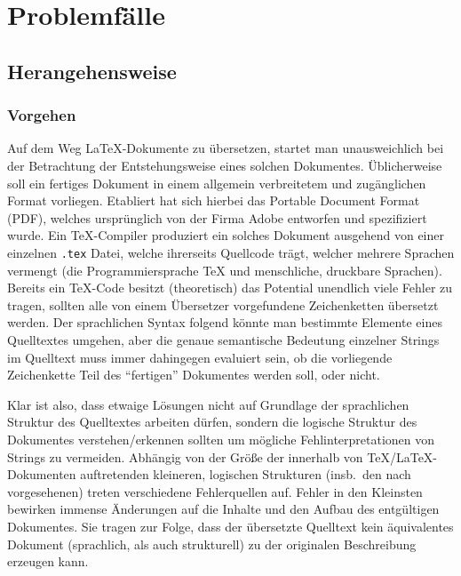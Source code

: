 \section{Problemfälle}
\subsection{Herangehensweise}
\subsubsection{Vorgehen}
Auf dem Weg \LaTeX{}-Dokumente zu übersetzen, startet man unausweichlich bei der Betrachtung der Entstehungsweise eines solchen Dokumentes. Üblicherweise soll ein fertiges Dokument in einem allgemein verbreitetem und zugänglichen Format vorliegen. Etabliert hat sich hierbei das Portable Document Format (PDF), welches ursprünglich von der Firma Adobe entworfen und spezifiziert wurde.%
Ein \TeX{}-Compiler produziert ein solches Dokument ausgehend von einer einzelnen \texttt{.tex} Datei, welche ihrerseits Quellcode trägt, welcher mehrere Sprachen vermengt (die Programmiersprache \TeX{} und menschliche, druckbare Sprachen).%
Bereits ein \TeX{}-Code besitzt (theoretisch) das Potential unendlich viele Fehler zu tragen, sollten alle von einem Übersetzer vorgefundene Zeichenketten übersetzt werden. 
Der sprachlichen Syntax folgend könnte man bestimmte Elemente eines Quelltextes umgehen, aber die genaue semantische Bedeutung einzelner Strings im Quelltext muss immer dahingegen evaluiert sein, ob die vorliegende Zeichenkette Teil des \enquote{fertigen} Dokumentes werden soll, oder nicht.

Klar ist also, dass etwaige Lösungen nicht auf Grundlage der sprachlichen Struktur des Quelltextes arbeiten dürfen, sondern die logische Struktur des Dokumentes verstehen/erkennen sollten um mögliche Fehlinterpretationen von Strings zu vermeiden.
Abhängig von der Größe der innerhalb von \TeX{}/\LaTeX{}-Dokumenten auftretenden kleineren, logischen Strukturen (insb.\ den nach~\cite{texbook} vorgesehenen) treten verschiedene Fehlerquellen auf. Fehler in den Kleinsten bewirken immense Änderungen auf die Inhalte und den Aufbau des entgültigen Dokumentes. Sie tragen zur Folge, dass der übersetzte Quelltext kein äquivalentes Dokument (sprachlich, als auch strukturell) zu der originalen Beschreibung erzeugen kann. 

